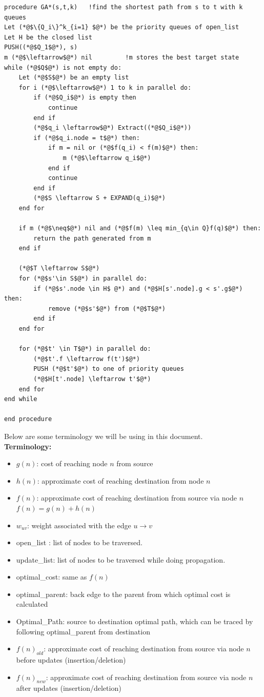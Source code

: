 \documentclass[a4paper]{article}
\begin{document}
\begin{lstlisting}[language=FORTRAN, caption=GA*]
procedure GA*(s,t,k)   !find the shortest path from s to t with k queues
Let (*@$\{Q_i\}^k_{i=1} $@*) be the priority queues of open_list
Let H be the closed list
PUSH((*@$Q_1$@*), s)
m (*@$\leftarrow$@*) nil         !m stores the best target state
while (*@$Q$@*) is not empty do:
    Let (*@$S$@*) be an empty list
    for i (*@$\leftarrow$@*) 1 to k in parallel do:
        if (*@$Q_i$@*) is empty then
            continue
        end if
        (*@$q_i \leftarrow$@*) Extract((*@$Q_i$@*))
        if (*@$q_i.node = t$@*) then:
            if m = nil or (*@$f(q_i) < f(m)$@*) then:
                m (*@$\leftarrow q_i$@*)
            end if
            continue
        end if
        (*@$S \leftarrow S + EXPAND(q_i)$@*)
    end for
    
    if m (*@$\neq$@*) nil and (*@$f(m) \leq min_{q\in Q}f(q)$@*) then:
        return the path generated from m
    end if

    (*@$T \leftarrow S$@*)
    for (*@$s'\in S$@*) in parallel do:
        if (*@$s'.node \in H$ @*) and (*@$H[s'.node].g < s'.g$@*) then:
            remove (*@$s'$@*) from (*@$T$@*)
        end if
    end for
    
    for (*@$t' \in T$@*) in parallel do:
        (*@$t'.f \leftarrow f(t')$@*)
        PUSH (*@$t'$@*) to one of priority queues
        (*@$H[t'.node] \leftarrow t'$@*)
    end for
end while

end procedure

\end{lstlisting}
Below are some terminology we will be using in this document.\\
\textbf{Terminology:}
\begin{itemize}
    \item $g(n)$: cost of reaching node $n$ from source
    \item $h(n)$: approximate cost of reaching destination from node $n$
    \item $f(n)$: approximate cost of reaching destination from source via node $n$ $f(n) = g(n) + h(n)$
    \item $w_{uv}$: weight associated with the edge $u \rightarrow v$
    \item open\_list : list of nodes to be traversed.
    \item update\_list: list of nodes to be traversed while doing propagation.
    \item optimal\_cost: same as $f(n)$
    \item optimal\_parent: back edge to the parent from which optimal cost is calculated
    \item Optimal\_Path: source to destination optimal path, which can be traced by following optimal\_parent from destination
    \item $f(n)_{old}$: approximate cost of reaching destination from source via node $n$ before updates (insertion/deletion)
    \item $f(n)_{new}$: approximate cost of reaching destination from source via node $n$ after updates (insertion/deletion)
\end{itemize}
\end{document}
